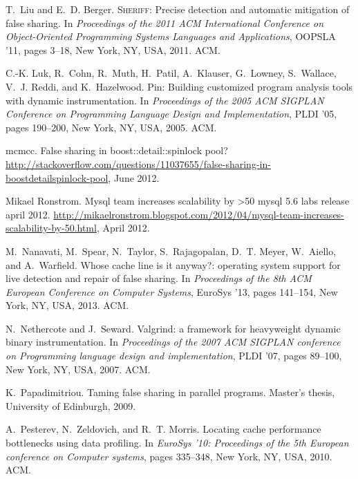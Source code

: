 \documentclass[10pt]{sigplanconf}
\begin{document}
\begin{thebibliography}{10}
T.~Liu and E.~D. Berger.
\newblock \textsc{Sheriff}: Precise detection and automatic mitigation of false
  sharing.
\newblock In {\em {Proceedings of the 2011 ACM International Conference on
  Object-Oriented Programming Systems Languages and Applications}}, OOPSLA '11,
  pages 3--18, New York, NY, USA, 2011. ACM.

C.-K. Luk, R.~Cohn, R.~Muth, H.~Patil, A.~Klauser, G.~Lowney, S.~Wallace, V.~J.
  Reddi, and K.~Hazelwood.
\newblock Pin: Building customized program analysis tools with dynamic
  instrumentation.
\newblock In {\em Proceedings of the 2005 ACM SIGPLAN Conference on Programming
  Language Design and Implementation}, PLDI '05, pages 190--200, New York, NY,
  USA, 2005. ACM.

\vfill\eject
{}
{mcmcc}.
\newblock False sharing in boost::detail::spinlock pool?
\newblock
  \url{http://stackoverflow.com/questions/11037655/false-sharing-in-boostdetailspinlock-pool},
  June 2012.

{Mikael Ronstrom}.
\newblock Mysql team increases scalability by >50%
  mysql 5.6 labs release april 2012.
\newblock
  \url{http://mikaelronstrom.blogspot.com/2012/04/mysql-team-increases-scalability-by-50.html},
  April 2012.

M.~Nanavati, M.~Spear, N.~Taylor, S.~Rajagopalan, D.~T. Meyer, W.~Aiello, and
  A.~Warfield.
\newblock Whose cache line is it anyway?: operating system support for live
  detection and repair of false sharing.
\newblock In {\em Proceedings of the 8th ACM European Conference on Computer
  Systems}, EuroSys '13, pages 141--154, New York, NY, USA, 2013. ACM.

N.~Nethercote and J.~Seward.
\newblock Valgrind: a framework for heavyweight dynamic binary instrumentation.
\newblock In {\em Proceedings of the 2007 ACM SIGPLAN conference on Programming
  language design and implementation}, PLDI '07, pages 89--100, New York, NY,
  USA, 2007. ACM.

K.~Papadimitriou.
\newblock Taming false sharing in parallel programs.
\newblock Master's thesis, University of Edinburgh, 2009.

A.~Pesterev, N.~Zeldovich, and R.~T. Morris.
\newblock Locating cache performance bottlenecks using data profiling.
\newblock In {\em EuroSys '10: Proceedings of the 5th European conference on
  Computer systems}, pages 335--348, New York, NY, USA, 2010. ACM.


\end{thebibliography}
\end{document}
